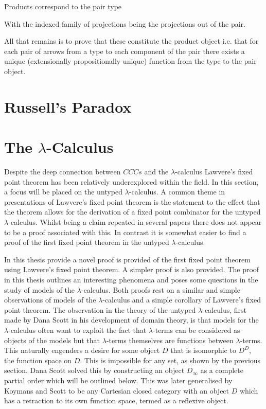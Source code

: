 Products correspond to the pair type


With the indexed family of projections being the projections out of the pair.


All that remains is to prove that these constitute the product object i.e. that
for each pair of arrows from a type to each component of the pair there exists a
unique (extensionally propositionally unique) function from the type to the pair object.



\section{Russell's Paradox}

\section{The $\lambda$-Calculus}

Despite the deep connection between $CCCs$ and the $\lambda$-calculus 
Lawvere's fixed point theorem has been relatively underexplored within the
field. In this section, a focus will be placed on the untyped
$\lambda$-calculus. A common theme in presentations of Lawvere's fixed point
theorem is the statement to the effect that the theorem allows for the
derivation of a fixed point combinator for the untyped $\lambda$-calculus.
Whilst being a claim repeated in several papers there does not appear to be a
proof associated with this. In contrast it is somewhat easier to find a proof
of the first fixed point theorem in the untyped $\lambda$-calculus. 

In this thesis provide a novel proof is provided of the first fixed point
theorem using Lawvere's fixed point theorem. A simpler proof is also provided.
The proof in this thesis outlines an interesting phenomena and poses some
questions in the study of models of the $\lambda$-calculus. Both proofs rest on
a similar and simple observations of models of the $\lambda$-calculus and a
simple corollary of Lawvere's fixed point theorem. The observation in the
theory of the untyped $\lambda$-calculus, first made by Dana Scott in his
development of domain theory, is that models for the $\lambda$-calculus often
want to exploit the fact that $\lambda$-terms can be considered as objects of
the models but that $\lambda$-terms themselves are functions between
$\lambda$-terms. This naturally engenders a desire for some object $D$ that is
isomorphic to $D^D$, the function space on $D$. This is impossible for any set,
as shown by the previous section. Dana Scott solved this by constructing an
object $D_{\infty}$ as a complete partial order which will be outlined below.
This was later generalised by Koymans and Scott to be any Cartesian closed
category with an object $D$ which has a retraction to its own function space,
termed as a reflexive object.

